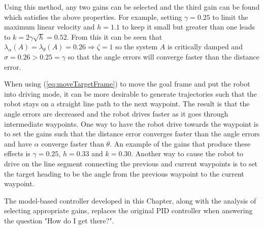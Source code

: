 Using this method, any two gains can be selected and the third gain can be found which satisfies the above properties. For example, setting $\gamma=0.25$ to limit the maximum linear velocity and $h=1.1$ to keep it small but greater than one leads to $k=2\gamma\sqrt{h}=0.52$. From this it can be seen that $\lambda_\alpha(A) = \lambda_\theta(A) = 0.26 \Rightarrow \zeta = 1$ so the system $A$ is critically damped and $\sigma = 0.26>0.25=\gamma$ so that the angle errors will converge faster than the distance error.

When using (\ref{eq:moveTargetFrame}) to move the goal frame and put the robot into driving mode, it can be more desirable to generate trajectories such that the robot stays on a straight line path to the next waypoint. The result is that the angle errors are decreased and the robot drives faster as it goes through intermediate waypoints. One way to have the robot drive towards the waypoint is to set the gains such that the distance error converges faster than the angle errors and have $\alpha$ converge faster than $\theta$. An example of the gains that produce these effects is $\gamma=0.25$, $h=0.33$ and $k=0.30$. Another way to cause the robot to drive on the line segment connecting the previous and current waypoints is to set the target heading to be the angle from the previous waypoint to the current waypoint.

The model-based controller developed in this Chapter, along with the analysis of selecting appropriate gains, replaces the original PID controller when answering the question "How do I get there?".
